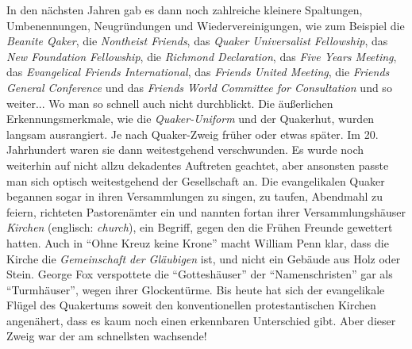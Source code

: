 In den nächsten Jahren gab es dann noch zahlreiche kleinere Spaltungen,
Umbenennungen, Neugründungen und Wiedervereinigungen, wie zum Beispiel die
\textit{Beanite Qaker}, die \textit{Nontheist
Friends}, das \textit{Quaker Universalist
Fellowship}, das \textit{New
Foundation Fellowship}, die
\textit{Richmond Declaration}, das \textit{Five
Years Meeting}, das \textit{Evangelical Friends International}, das \textit{Friends United
Meeting}, die \textit{Friends General
Conference} und das \textit{Friends
World Committee for Consultation} und so weiter... Wo man so schnell auch nicht
durchblickt.
Die äußerlichen Erkennungsmerkmale, wie die \textit{Quaker-Uniform} und der Quakerhut, wurden
langsam ausrangiert. Je nach Quaker-Zweig früher oder etwas später. Im 20.
Jahrhundert waren sie dann weitestgehend verschwunden. Es wurde noch weiterhin
auf
nicht allzu dekadentes Auftreten geachtet, aber ansonsten passte man sich
optisch weitestgehend der Gesellschaft an. Die evangelikalen Quaker begannen
sogar in ihren Versammlungen zu singen, zu taufen, Abendmahl zu feiern,
richteten Pastorenämter ein und nannten
fortan ihrer Versammlungshäuser \textit{Kirchen}
(englisch: \textit{church}),
ein Begriff, gegen den die Frühen Freunde gewettert hatten. Auch in "`Ohne Kreuz
keine Krone"' macht William Penn klar, dass die Kirche die \textit{Gemeinschaft
der
Gläubigen} ist, und nicht ein Gebäude aus Holz oder Stein. George Fox
verspottete
die "`Gotteshäuser"' der "`Namenschristen"' gar als
"`Turmhäuser"', wegen ihrer
Glockentürme. Bis heute hat sich der evangelikale Flügel des Quakertums soweit
den konventionellen protestantischen Kirchen angenähert, dass es kaum noch
einen
erkennbaren Unterschied gibt. Aber dieser Zweig war der am schnellsten
wachsende!

\medskip

